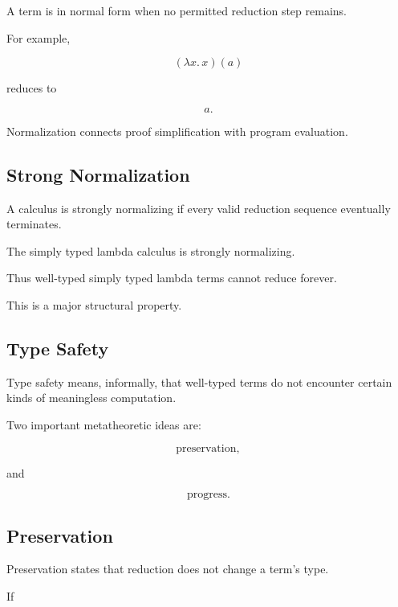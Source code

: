 A term is in normal form when no permitted reduction step remains.

For example,

\[
(\lambda x.\,x)(a)
\]

reduces to

\[
\boxed{
a.
}
\]

Normalization connects proof simplification with program evaluation.

\subsection{Strong Normalization}
\label{subsec:type-theory-strong-normalization}

A calculus is strongly normalizing if every valid reduction sequence
eventually terminates.

The simply typed lambda calculus is strongly normalizing.

Thus well-typed simply typed lambda terms cannot reduce forever.

This is a major structural property.

\subsection{Type Safety}
\label{subsec:type-safety}

Type safety means, informally, that well-typed terms do not encounter
certain kinds of meaningless computation.

Two important metatheoretic ideas are:

\[
\boxed{
\text{preservation},
}
\]

and

\[
\boxed{
\text{progress}.
}
\]

\subsection{Preservation}
\label{subsec:type-preservation}

Preservation states that reduction does not change a term's type.

If


